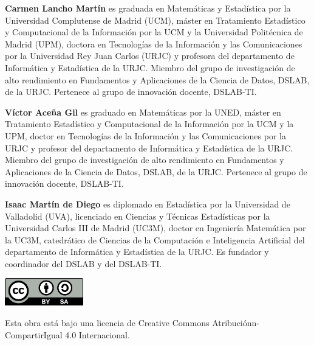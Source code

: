 \documentclass[
  letterpaper,
  DIV=11,
  numbers=noendperiod]{scrreprt}
\begin{document}
\begin{tcolorbox}[enhanced jigsaw, arc=.35mm, breakable, coltitle=black, left=2mm, opacityback=0, bottomtitle=1mm, colbacktitle=quarto-callout-note-color!10!white, title=\textcolor{quarto-callout-note-color}{\faInfo}\hspace{0.5em}{Sobre los autores}, titlerule=0mm, colback=white, colframe=quarto-callout-note-color-frame, bottomrule=.15mm, rightrule=.15mm, opacitybacktitle=0.6, toptitle=1mm, toprule=.15mm, leftrule=.75mm]

\textbf{Carmen Lancho Martín} es graduada en Matemáticas y Estadística
por la Universidad Complutense de Madrid (UCM), máster en Tratamiento
Estadístico y Computacional de la Información por la UCM y la
Universidad Politécnica de Madrid (UPM), doctora en Tecnologías de la
Información y las Comunicaciones por la Universidad Rey Juan Carlos
(URJC) y profesora del departamento de Informática y Estadística de la
URJC. Miembro del grupo de investigación de alto rendimiento en
Fundamentos y Aplicaciones de la Ciencia de Datos, DSLAB, de la URJC.
Pertenece al grupo de innovación docente, DSLAB-TI.

\textbf{Víctor Aceña Gil} es graduado en Matemáticas por la UNED, máster
en Tratamiento Estadístico y Computacional de la Información por la UCM
y la UPM, doctor en Tecnologías de la Información y las Comunicaciones
por la URJC y profesor del departamento de Informática y Estadística de
la URJC. Miembro del grupo de investigación de alto rendimiento en
Fundamentos y Aplicaciones de la Ciencia de Datos, DSLAB, de la URJC.
Pertenece al grupo de innovación docente, DSLAB-TI.

\textbf{Isaac Martín de Diego} es diplomado en Estadística por la
Universidad de Valladolid (UVA), licenciado en Ciencias y Técnicas
Estadísticas por la Universidad Carlos III de Madrid (UC3M), doctor en
Ingeniería Matemática por la UC3M, catedrático de Ciencias de la
Computación e Inteligencia Artificial del departamento de Informática y
Estadística de la URJC. Es fundador y coordinador del DSLAB y del
DSLAB-TI.

\end{tcolorbox}

\includegraphics[width=1.34in,height=\textheight]{by-sa.png}

Esta obra está bajo una licencia de Creative Commons
Atribuciónn-CompartirIgual 4.0 Internacional.
\end{document}
